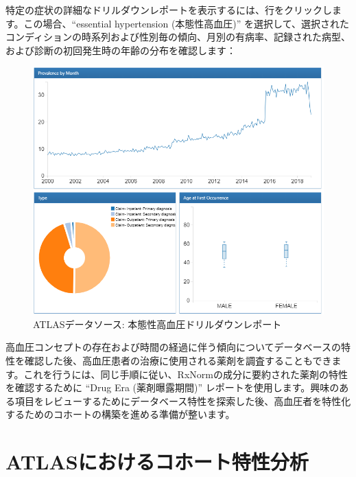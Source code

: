 \documentclass[
  11pt]{book}
\theoremstyle{definition}
\theoremstyle{definition}
\theoremstyle{definition}
\theoremstyle{definition}
\theoremstyle{remark}
\begin{document}
特定の症状の詳細なドリルダウンレポートを表示するには、行をクリックします。この場合、``essential hypertension (本態性高血圧)'' を選択して、選択されたコンディションの時系列および性別毎の傾向、月別の有病率、記録された病型、および診断の初回発生時の年齢の分布を確認します：

\begin{figure}

{\centering \includegraphics[width=1\linewidth]{images/Characterization/atlasDataSourcesDrillDownReport} 

}

\caption{ATLASデータソース: 本態性高血圧ドリルダウンレポート}\label{fig:atlasDataSourcesDrillDownReport}
\end{figure}

高血圧コンセプトの存在および時間の経過に伴う傾向についてデータベースの特性を確認した後、高血圧患者の治療に使用される薬剤を調査することもできます。これを行うには、同じ手順に従い、RxNormの成分に要約された薬剤の特性を確認するために ``Drug Era (薬剤曝露期間)'' レポートを使用します。興味のある項目をレビューするためにデータベース特性を探索した後、高血圧者を特性化するためのコホートの構築を進める準備が整います。

\section{ATLASにおけるコホート特性分析}\label{atlasux306bux304aux3051ux308bux30b3ux30dbux30fcux30c8ux7279ux6027ux5206ux6790}
\end{document}
